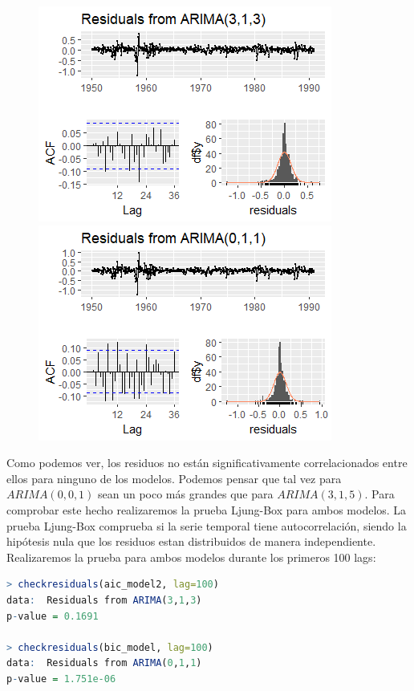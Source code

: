 \documentclass[a4paper,]{article}
\begin{document}
\begin{figure}[H]
    \centering
\includegraphics[scale=0.8]{Residuals from ARIMA(3,1,3).png}
\includegraphics[scale=0.8]{Residuals from ARIMA(0,1,1).png}
\end{figure}

Como podemos ver, los residuos no están significativamente correlacionados entre ellos para ninguno de los modelos. Podemos pensar que tal vez para $ARIMA(0,0,1)$ sean un poco más grandes que para $ARIMA(3,1,5)$. Para comprobar este hecho realizaremos la prueba Ljung-Box para ambos modelos. La prueba Ljung-Box comprueba si la serie temporal tiene autocorrelación, siendo la hipótesis nula que los residuos estan distribuidos de manera independiente. \\

Realizaremos la prueba para ambos modelos durante los primeros 100 lags:
\begin{lstlisting}[language=R]
> checkresiduals(aic_model2, lag=100)
data:  Residuals from ARIMA(3,1,3)
p-value = 0.1691

> checkresiduals(bic_model, lag=100)
data:  Residuals from ARIMA(0,1,1)
p-value = 1.751e-06
\end{lstlisting}
\end{document}
